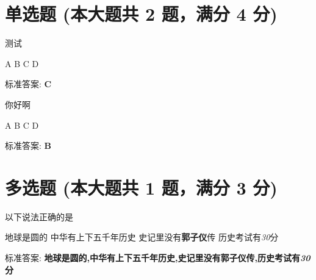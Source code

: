 \documentclass[12pt, a4paper, addpoints]{exam}
\begin{document}
\pagestyle{headandfoot}
\runningheadrule
{}

\begin{center}
\end{center}
\vspace{5mm}

\normalsize
\vspace{5mm}

\section{\normalsize{单选题 (本大题共 2 题，满分 4 分)}}
\hspace{1.5cm}
\begin{questions}
\question[2] 测试

\begin{oneparchoices}
\choice A
\choice B
\choice C
\choice D
\end{oneparchoices}

标准答案: \textbf{C}

\question[2] 你好啊

\begin{oneparchoices}
\choice A
\choice B
\choice C
\choice D
\end{oneparchoices}

标准答案: \textbf{B}

\end{questions}

\hspace{5cm}

\section{\normalsize{多选题 (本大题共 1 题，满分 3 分)}}
\hspace{1.5cm}
\begin{questions}
\question[3] 以下说法正确的是

\begin{checkboxes}
\choice 地球是圆的
\choice 中华有上下五千年历史
\choice 史记里没有\textbf{郭子仪}传
\choice 历史考试有\textit{30}分
\end{checkboxes}

标准答案: \textbf{地球是圆的,中华有上下五千年历史,史记里没有\textbf{郭子仪}传,历史考试有\textit{30}分}

\end{questions}
\end{document}
